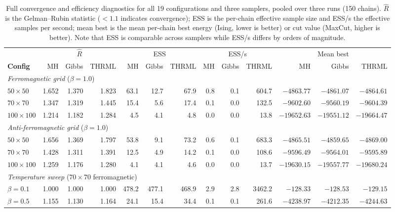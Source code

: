 \documentclass[conference]{IEEEtran}
\begin{document}
\begin{table}[t]
  \caption{Full convergence and efficiency diagnostics for all 19 configurations and three samplers, pooled over three runs (150 chains). $\hat{R}$ is the Gelman--Rubin statistic ($<1.1$ indicates convergence); ESS is the per-chain effective sample size and ESS/s the effective samples per second; mean best is the mean per-chain best energy (Ising, lower is better) or cut value (MaxCut, higher is better). Note that ESS is comparable across samplers while ESS/s differs by orders of magnitude.}
  \label{tab:full_diagnostics}
  \centering
  \scriptsize
  \setlength{\tabcolsep}{3pt}
  \begin{tabular}{l rrr rrr rrr rrr}
    \hline
    & \multicolumn{3}{c}{$\hat{R}$} & \multicolumn{3}{c}{ESS} & \multicolumn{3}{c}{ESS/s} & \multicolumn{3}{c}{Mean best} \\
    \textbf{Config} & MH & Gibbs & THRML & MH & Gibbs & THRML & MH & Gibbs & THRML & MH & Gibbs & THRML \\
    \hline
    \multicolumn{13}{l}{\textit{Ferromagnetic grid} ($\beta=1.0$)} \\
    $50{\times}50$   & 1.652 & 1.370 & 1.823 & 63.1 & 12.7 & 67.9 & 0.8 & 0.1 & 604.7 & $-4863.77$ & $-4861.07$ & $-4864.61$ \\
    $70{\times}70$   & 1.347 & 1.319 & 1.445 & 15.4 & 5.6 & 17.4 & 0.1 & 0.0 & 132.5 & $-9602.60$ & $-9560.19$ & $-9604.39$ \\
    $100{\times}100$ & 1.214 & 1.182 & 1.284 & 4.5 & 4.1 & 4.8 & 0.0 & 0.0 & 13.8  & $-19652.63$ & $-19551.12$ & $-19664.47$ \\
    \multicolumn{13}{l}{\textit{Anti-ferromagnetic grid} ($\beta=1.0$)} \\
    $50{\times}50$   & 1.656 & 1.369 & 1.797 & 53.8 & 9.1 & 73.2 & 0.6 & 0.1 & 683.3 & $-4865.51$ & $-4859.65$ & $-4869.00$ \\
    $70{\times}70$   & 1.428 & 1.311 & 1.391 & 12.5 & 4.9 & 14.2 & 0.1 & 0.0 & 108.6 & $-9596.49$ & $-9564.01$ & $-9595.89$ \\
    $100{\times}100$ & 1.259 & 1.176 & 1.280 & 4.1 & 4.1 & 4.6 & 0.0 & 0.0 & 13.7  & $-19630.15$ & $-19557.77$ & $-19680.24$ \\
    \multicolumn{13}{l}{\textit{Temperature sweep} ($70{\times}70$ ferromagnetic)} \\
    $\beta=0.1$ & 1.000 & 1.000 & 1.000 & 478.2 & 477.1 & 468.9 & 2.9 & 2.8 & 3462.2 & $-128.33$ & $-128.53$ & $-129.15$ \\
    $\beta=0.5$ & 1.155 & 1.130 & 1.164 & 24.1 & 15.4 & 34.4 & 0.1 & 0.1 & 261.6 & $-4238.97$ & $-4212.35$ & $-4244.63$ \\

\end{tabular}
\end{table}
\end{document}
